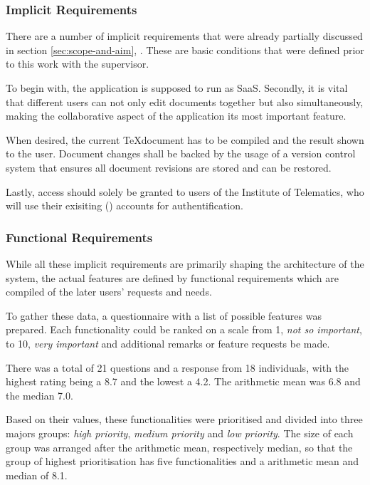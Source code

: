 \subsubsection{Implicit Requirements}
\label{subsubsec:implicit-requirements}
There are a number of implicit requirements that were already partially discussed in section \ref{sec:scope-and-aim}, . These are basic conditions that were defined prior to this work with the supervisor.

To begin with, the application is supposed to run as SaaS. Secondly, it is vital that different users can not only edit documents together but also simultaneously, making the collaborative aspect of the application its most important feature. 

When desired, the current \TeX document has to be compiled and the result shown to the user. Document changes shall be backed by the usage of a version control system that ensures all document revisions are stored and can be restored.

Lastly, access should solely be granted to users of the Institute of Telematics, who will use their exisiting  () accounts for authentification.

\subsubsection{Functional Requirements}
\label{subsubsec:functional-requirements}
While all these implicit requirements are primarily shaping the architecture of the system, the actual features are defined by functional requirements which are compiled of the later users' requests and needs. 
 
To gather these data, a questionnaire with a list of possible features was prepared. Each functionality could be ranked on a scale from 1, \textit{not so important}, to 10, \textit{very important} and additional remarks or feature requests be made. 

There was a total of 21 questions and a response from 18 individuals, with the highest rating being a 8.7 and the lowest a 4.2. The arithmetic mean was 6.8 and the median 7.0. 

Based on their values, these functionalities were prioritised and divided into three majors groups: \textit{high priority}, \textit{medium priority} and \textit{low priority}. The size of each group was arranged after the arithmetic mean, respectively median, so that the group of highest prioritisation has five functionalities and a arithmetic mean and median of 8.1.

